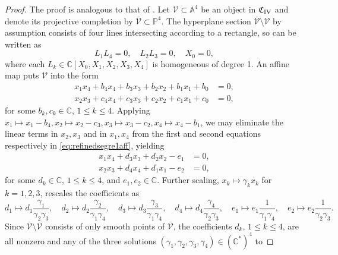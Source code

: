 \documentclass[a4paper,reqno]{amsart}
\numberwithin{equation}{section}
\numberwithin{equation}{section}
\begin{document}
\begin{proof}
The proof is analogous to that of .
Let $\mathcal{V}\subset \mathbb{A}^4$ be an object in $\mathfrak{C}_{\rm IV}$ and denote its projective completion by $\overline{\mathcal{V}} \subset \mathbb{P}^4$. 
The hyperplane section $\overline{\mathcal{V}}\setminus \mathcal{V}$ by assumption  consists of four lines intersecting according to a rectangle, so can be written as
\begin{equation*}
    L_1 L_4 =0,\quad L_2 L_3=0,\quad X_0=0,
\end{equation*}
where each $L_k\in \mathbb{C}[X_0,X_1,X_2,X_3,X_4]$ is homogeneous of degree 1. 
An affine map puts $\mathcal{V}$ into the form
\begin{equation}\label{eq:refinedsegre1aff}
\begin{aligned}
    x_1 x_4+ b_4x_4+b_3x_3+b_2x_2+b_1x_1+b_0 &= 0, \\
    x_2 x_3+ c_4x_4+c_3x_3+c_2x_2+c_1x_1+c_0&=0,
\end{aligned}
\end{equation}
for some $b_{k},c_{k}\in\mathbb{C}$, $1\leq k\leq 4$.
Applying $x_1\mapsto x_1-b_4,x_2\mapsto x_2-c_3,x_3\mapsto x_3-c_2,x_4\mapsto x_4-b_1$, we may eliminate the linear terms in $x_2,x_3$ and in $x_1,x_4$ from the first and second equations respectively in \eqref{eq:refinedsegre1aff}, yielding
\begin{equation*}
\begin{aligned}
    x_1 x_4 +d_3 x_3+d_2 x_2-e_1 &= 0, \\
    x_2 x_3+d_4 x_4+d_1 x_1-e_2    &=0,
\end{aligned}\end{equation*}
for some $d_k\in\mathbb{C}$, $1\leq k\leq 4$, and $e_1,e_2\in\mathbb{C}$.
Further scaling, 
$x_k\mapsto \gamma_k x_k$ for $k=1,2,3$, rescales the coefficients as
\begin{equation*}
    d_1\mapsto d_1 \frac{\gamma_1}{\gamma_2\gamma_3},\quad 
    d_2\mapsto d_2 \frac{\gamma_2}{\gamma_1\gamma_4},\quad
    d_3\mapsto d_3 \frac{\gamma_3}{\gamma_1\gamma_4},\quad
    d_4\mapsto d_4 \frac{\gamma_4}{\gamma_2\gamma_3}, \quad
   e_1\mapsto e_1 \frac{1}{\gamma_1\gamma_4},\quad 
    e_2\mapsto e_2 \frac{1}{\gamma_2\gamma_3}.
\end{equation*}
Since $\overline{\mathcal{V}}\setminus \mathcal{V}$ consists of only smooth points of $\overline{\mathcal{V}}$, the coefficients $d_k$, $1\leq k\leq 4$, are all nonzero and any of the three solutions $(\gamma_1,\gamma_2,\gamma_3,\gamma_4)\in(\mathbb{C}^*)^4$ to

\end{proof}
\end{document}
